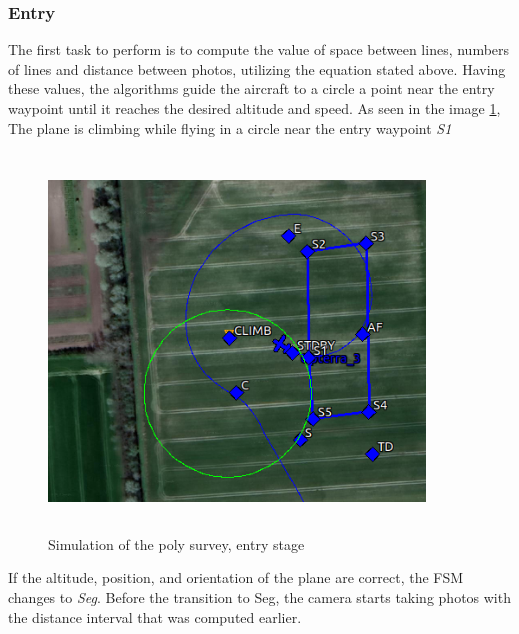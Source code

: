 \subsubsection{Entry}
The first task to perform is to compute the value of space between lines, numbers of lines and distance between photos, utilizing the equation stated above. Having these values, the algorithms guide the aircraft to a circle a point near the entry waypoint until it reaches the desired altitude and speed. As seen in the image \ref{fig:entry_stage}, The plane is climbing while flying in a circle near the entry waypoint \textit{S1}
\begin{figure}[H]
\centering
\includegraphics[width=10cm,height=10cm,keepaspectratio]{imagenes/Entry.png}
\caption{Simulation of the poly survey, entry stage}
\label{fig:entry_stage}
\end{figure}
If the altitude, position, and orientation of the plane are correct, the FSM changes to \textit{Seg}. Before the transition to Seg, the camera starts taking photos with the distance interval that was computed earlier.
